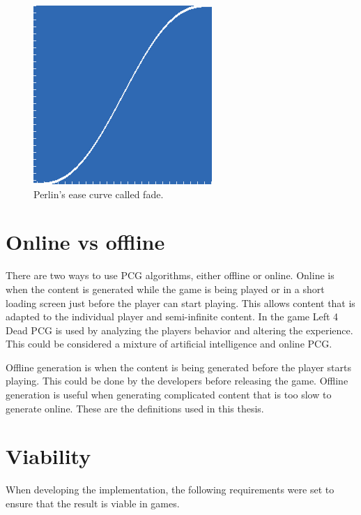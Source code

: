 \begin{figure}[h]
	\centering
	\includegraphics[width=0.35\linewidth]{"Images/fade"}
	\caption{Perlin's ease curve called fade.}
	\label{fig:fade}
\end{figure}
	
\section{Online vs offline}\label{sec:online-offline}
There are two ways to use PCG algorithms, either offline or online. Online is when the content is generated while the game is being played or in a short loading screen just before the player can start playing. This allows content that is adapted to the individual player and semi-infinite content\cite{PCGGames}. In the game Left 4 Dead\cite{Left4Dead} PCG is used by analyzing the players behavior and altering the experience. This could be considered a mixture of artificial intelligence and online PCG.
\par
Offline generation is when the content is being generated before the player starts playing. This could be done by the developers before releasing the game. Offline generation is useful when generating complicated content that is too slow to generate online. These are the definitions used in this thesis.
	
\section{Viability}\label{sec:viability}
When developing the implementation, the following requirements were set to ensure that the result is viable in games.
	
